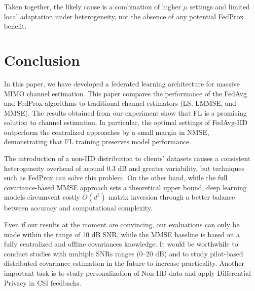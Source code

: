 \documentclass{llncs}
\begin{document}
Taken together, the likely cause is a combination of higher $\mu$ settings and limited local adaptation under heterogeneity, not the absence of any potential FedProx benefit.



\section{Conclusion}
In this paper, we have developed a federated learning architecture for massive MIMO channel estimation. This paper compares the performance of the FedAvg and FedProx algorithms to traditional channel estimators (LS, LMMSE, and MMSE). The results obtained from our experiment show that FL is a promising solution to channel estimation. In particular, the optimal settings of FedAvg-IID outperform the centralized approaches by a small margin in NMSE, demonstrating that FL training preserves model performance.


The introduction of a non-IID distribution to clients' datasets causes a consistent heterogeneity overhead of around 0.3 dB and greater variability, but techniques such as FedProx can solve this problem. On the other hand, while
the full covariance-based MMSE approach sets a theoretical upper bound, deep learning models circumvent costly $O(d^3)$ matrix inversion through a better balance between accuracy and computational complexity.


Even if our results at the moment are convincing, our evaluations can only be made within the range of 10 dB SNR, while the MMSE baseline is based on a fully centralized and offline covariances knowledge. It would be worthwhile to conduct studies with multiple SNRs ranges (0–20 dB) and to study pilot-based distributed covariance estimation in the future to increase practicality. Another important task is to study personalization of Non-IID data and apply Differential Privacy in CSI feedbacks.



\end{document}
